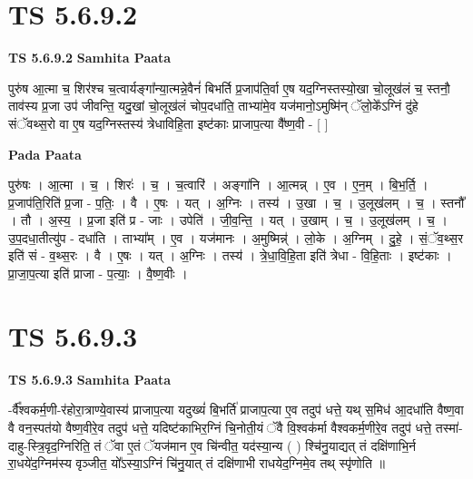 \documentclass[17pt]{extarticle}
\begin{document}

\section{ TS 5.6.9.2 }

\textbf{TS 5.6.9.2 } \newline
\textbf{Samhita Paata} \newline

पुरु॑ष आ॒त्मा च॒ शिर॑श्च च॒त्वार्यङ्गा᳚न्या॒त्मन्ने॒वैनं॑ बिभर्ति प्र॒जाप॑ति॒र्वा ए॒ष यद॒ग्निस्तस्यो॒खा चो॒लूख॑लं च॒ स्तनौ॒ ताव॑स्य प्र॒जा उप॑ जीवन्ति॒ यदु॒खां चो॒लूख॑लं चोप॒दधा॑ति॒ ताभ्या॑मे॒व यज॑मानो॒ऽमुष्मि॑न् ॅलो॒के᳚ऽग्निं दु॑हे संॅवथ्स॒रो वा ए॒ष यद॒ग्निस्तस्य॑ त्रेधाविहि॒ता इष्ट॑काः प्राजाप॒त्या वै᳚ष्ण॒वी - [  ] \newline

\textbf{Pada Paata} \newline

पुरु॑षः । आ॒त्मा । च॒ । शिरः॑ । च॒ । च॒त्वारि॑ । अङ्गा॑नि । आ॒त्मन्न् । ए॒व । ए॒न॒म् । बि॒भ॒र्ति॒ । प्र॒जाप॑ति॒रिति॑ प्र॒जा - प॒तिः॒ । वै । ए॒षः । यत् । अ॒ग्निः । तस्य॑ । उ॒खा । च॒ । उ॒लूख॑लम् । च॒ । स्तनौ᳚ । तौ । अ॒स्य॒ । प्र॒जा इति॑ प्र - जाः । उपेति॑ । जी॒व॒न्ति॒ । यत् । उ॒खाम् । च॒ । उ॒लूख॑लम् । च॒ । उ॒प॒दधा॒तीत्यु॑प - दधा॑ति । ताभ्या᳚म् । ए॒व । यज॑मानः । अ॒मुष्मिन्न्॑ । लो॒के । अ॒ग्निम् । दु॒हे॒ । सं॒ॅव॒थ्स॒र इति॑ सं - व॒थ्स॒रः । वै । ए॒षः । यत् । अ॒ग्निः । तस्य॑ । त्रे॒धा॒वि॒हि॒ता इति॑ त्रेधा - वि॒हि॒ताः । इष्ट॑काः । प्रा॒जा॒प॒त्या इति॑ प्राजा - प॒त्याः॒ । वै॒ष्ण॒वीः ।  \newline





\section{ TS 5.6.9.3 }

\textbf{TS 5.6.9.3 } \newline
\textbf{Samhita Paata} \newline

-र्वै᳚श्वकर्म॒णी-र॑होरा॒त्राण्ये॒वास्य॑ प्राजाप॒त्या यदुख्यं॑ बि॒भर्ति॑ प्राजाप॒त्या ए॒व तदुप॑ धत्ते॒ यथ् स॒मिध॑ आ॒दधा॑ति वैष्ण॒वा वै वन॒स्पत॑यो वैष्ण॒वीरे॒व तदुप॑ धत्ते॒ यदिष्ट॑काभिर॒ग्निं चि॒नोती॒यं ॅवै वि॒श्वक॑र्मा वैश्वकर्म॒णीरे॒व तदुप॑ धत्ते॒ तस्मा॑-दाहु-स्त्रि॒वृद॒ग्निरिति॒ तं ॅवा ए॒तं ॅयज॑मान ए॒व चि॑न्वीत॒ यद॑स्या॒न्य ( ) श्चि॑नु॒याद्यत् तं दक्षि॑णाभि॒र्न रा॒धये॑द॒ग्निम॑स्य वृञ्जीत॒ यो᳚ऽस्या॒ऽग्निं चि॑नु॒यात् तं दक्षि॑णाभी राधयेद॒ग्निमे॒व तथ् स्पृ॑णोति ॥ \newline
\end{document}
